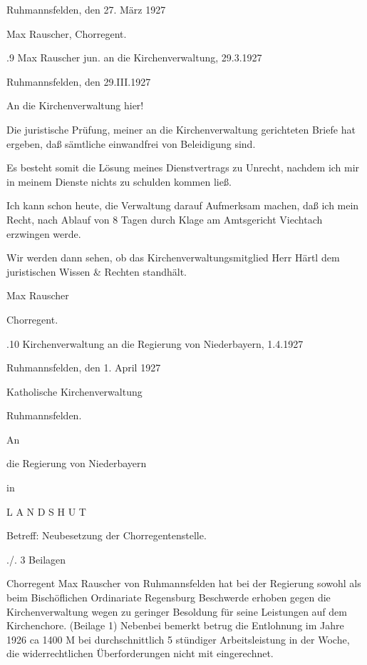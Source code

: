 Ruhmannsfelden, den 27. März 1927



Max Rauscher, Chorregent.

.9 Max Rauscher jun. an die Kirchenverwaltung, 29.3.1927

Ruhmannsfelden, den 29.III.1927



An die Kirchenverwaltung hier!



Die juristische Prüfung, meiner an die Kirchenverwaltung gerichteten Briefe hat
ergeben, daß sämtliche einwandfrei von Beleidigung sind.

Es besteht somit die Lösung meines Dienstvertrags zu Unrecht, nachdem ich mir in
meinem Dienste nichts zu schulden kommen ließ.

Ich kann schon heute, die Verwaltung darauf Aufmerksam machen, daß ich mein
Recht, nach Ablauf von 8 Tagen durch Klage am Amtsgericht Viechtach erzwingen
werde.

Wir werden dann sehen, ob das Kirchenverwaltungsmitglied Herr Härtl dem
juristischen Wissen & Rechten standhält.



Max Rauscher

Chorregent.

.10 Kirchenverwaltung an die Regierung von Niederbayern, 1.4.1927

Ruhmannsfelden, den 1. April 1927

Katholische Kirchenverwaltung

Ruhmannsfelden.



An

die Regierung von Niederbayern

in

    L A N D S H U T



    Betreff: Neubesetzung der Chorregentenstelle.



./. 3 Beilagen

Chorregent Max Rauscher von Ruhmannsfelden hat bei der Regierung sowohl als beim
Bischöflichen Ordinariate Regensburg Beschwerde erhoben gegen die
Kirchenverwaltung wegen zu geringer Besoldung für seine Leistungen auf dem
Kirchenchore. (Beilage 1) Nebenbei bemerkt betrug die Entlohnung im Jahre 1926
ca 1400 M bei durchschnittlich 5 stündiger Arbeitsleistung in der Woche, die
widerrechtlichen Überforderungen nicht mit eingerechnet.

